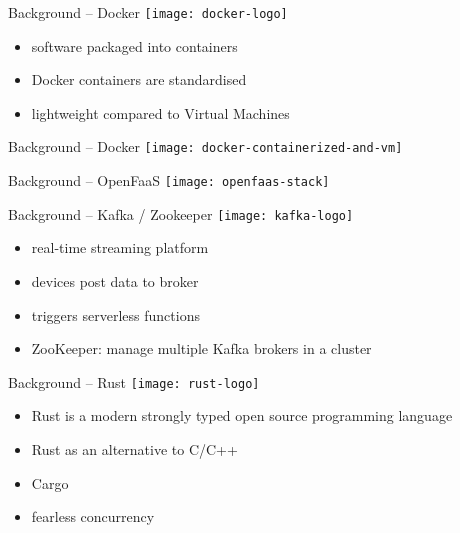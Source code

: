 \begin{frame}{Background -- Docker}
  \texttt{[image: docker-logo]}

  \vspace*{1.5em}

  \begin{itemize}
    \item software packaged into containers
    \item Docker containers are standardised
    \item lightweight compared to Virtual Machines
  \end{itemize}
\end{frame}

\begin{frame}{Background -- Docker}
  \vfill
  \texttt{[image: docker-containerized-and-vm]}
\end{frame}

\begin{frame}{Background -- OpenFaaS}
  \texttt{[image: openfaas-stack]}
\end{frame}

\begin{frame}{Background -- Kafka / Zookeeper}
  \texttt{[image: kafka-logo]}

  \vspace*{1.5em}

  \begin{itemize}
    \item real-time streaming platform
    \item devices post data to broker
    \item triggers serverless functions
    \item ZooKeeper: manage multiple Kafka brokers in a cluster
  \end{itemize}
\end{frame}

\begin{frame}{Background -- Rust}
  \texttt{[image: rust-logo]}

  \vspace*{1.5em}

  \begin{itemize}
    \item Rust is a modern strongly typed open source programming language
    \item Rust as an alternative to C/C++
    \item Cargo
    \item fearless concurrency
  \end{itemize}
\end{frame}

